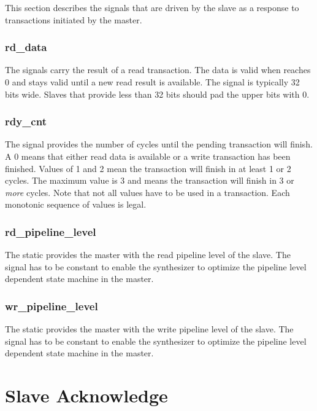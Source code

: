 This section describes the signals that are driven by the slave as a
response to transactions initiated by the master.

\subsubsection{rd\_data}

The  signals carry the result of a read transaction.
The data is valid when  reaches 0 and stays valid
until a new read result is available. The signal is typically 32 bits
wide. Slaves that provide less than 32 bits should pad the upper bits
with 0.

\subsubsection{rdy\_cnt}

The  signal provides the number of cycles until the
pending transaction will finish. A 0 means that either read data is
available or a write transaction has been finished. Values of 1 and 2
mean the transaction will finish in at least 1 or 2 cycles. The
maximum value is 3 and means the transaction will finish in 3 or
\emph{more} cycles. Note that not all values have to be used in a
transaction. Each monotonic sequence of  values is
legal.

\subsubsection{rd\_pipeline\_level}

The static  provides the master with the
read pipeline level of the slave. The signal has to be constant to
enable the synthesizer to optimize the pipeline level dependent
state machine in the master.


\subsubsection{wr\_pipeline\_level}

The static  provides the master with the
write pipeline level of the slave. The signal has to be constant to
enable the synthesizer to optimize the pipeline level dependent
state machine in the master.

\section{Slave Acknowledge}
\label{sec:ack}

